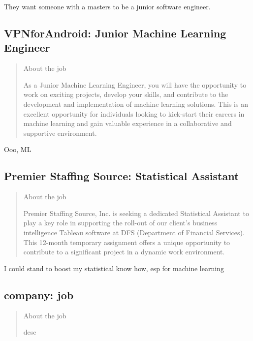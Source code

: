 \documentclass[
	letterpaper, %
	12pt, %
]{CSSullivanBusinessReport}
\begin{document}
They want someone with a masters to be a junior software engineer.


\subsection[VPNforAndroid]{VPNforAndroid: Junior Machine Learning Engineer}

\begin{quote}
	About the job
	
	As a Junior Machine Learning Engineer, you will have the opportunity to work on exciting projects, develop your skills, and contribute to the development and implementation of machine learning solutions. This is an excellent opportunity for individuals looking to kick-start their careers in machine learning and gain valuable experience in a collaborative and supportive environment.


\end{quote}

Ooo, ML



\subsection[Premier Staffing Source]{Premier Staffing Source: Statistical Assistant}

\begin{quote}
	About the job
	
	Premier Staffing Source, Inc. is seeking a dedicated Statistical Assistant to play a key role in supporting the roll-out of our client's business intelligence Tableau software at DFS (Department of Financial Services). This 12-month temporary assignment offers a unique opportunity to contribute to a significant project in a dynamic work environment.

\end{quote}

I could stand to boost my statistical know how, esp for machine learning


\subsection[company]{company: job}

\begin{quote}
	About the job
	
	desc

\end{quote}
\end{document}
